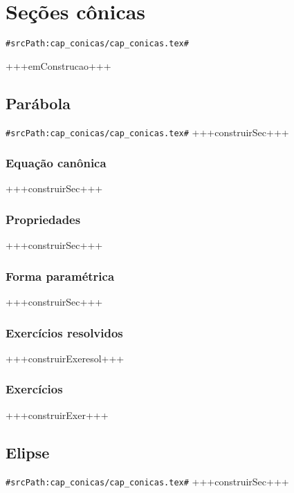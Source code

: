 
\chapter{Seções cônicas}
\verb+#srcPath:cap_conicas/cap_conicas.tex#+
\label{chap:conicas}

+++emConstrucao+++

\section{Parábola}
\verb+#srcPath:cap_conicas/cap_conicas.tex#+
+++construirSec+++

\subsection{Equação canônica}
+++construirSec+++

\subsection{Propriedades}
+++construirSec+++

\subsection{Forma paramétrica}
+++construirSec+++

\subsection*{Exercícios resolvidos}
+++construirExeresol+++

\subsection*{Exercícios}
+++construirExer+++

\section{Elipse}
\verb+#srcPath:cap_conicas/cap_conicas.tex#+
+++construirSec+++

